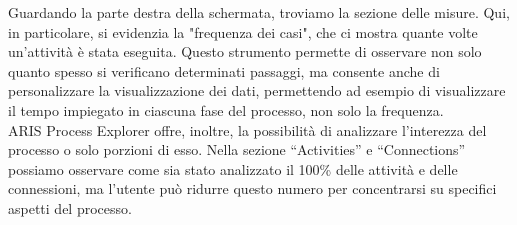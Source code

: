 \documentclass{article}
\begin{document}
Guardando la parte destra della schermata, troviamo la sezione delle misure. Qui, in particolare, si evidenzia la "frequenza dei casi", che ci mostra quante volte un'attività è stata eseguita. Questo strumento permette di osservare non solo quanto spesso si verificano determinati passaggi, ma consente anche di personalizzare la visualizzazione dei dati, permettendo ad esempio di visualizzare il tempo impiegato in ciascuna fase del processo, non solo la frequenza.\\
ARIS Process Explorer offre, inoltre, la possibilità di analizzare l’interezza del processo o solo porzioni di esso. Nella sezione “Activities” e “Connections” possiamo osservare come sia stato analizzato il 100\% delle attività e delle connessioni, ma l'utente può ridurre questo numero per concentrarsi su specifici aspetti del processo.
\end{document}
